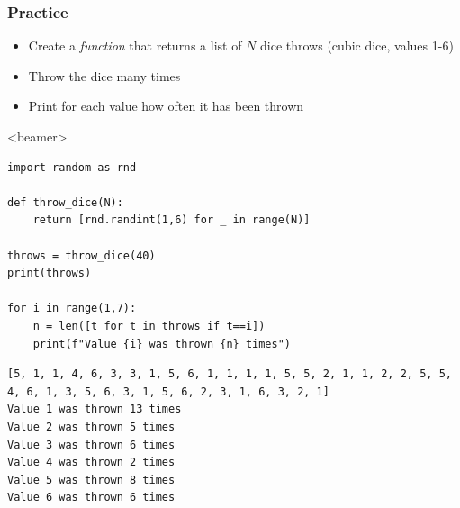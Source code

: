 \begin{frame}[fragile,label=practice_random]
  \frametitle{Practice}
  \begin{itemize}
    \item Create a \emph{function} that returns a list of $N$ dice throws (cubic dice, values 1-6)
    \item Throw the dice many times
    \item Print for each value how often it has been thrown
  \end{itemize} \pause
  \begin{onlyenv}<beamer>
    \begin{lstlisting}
import random as rnd

def throw_dice(N):
    return [rnd.randint(1,6) for _ in range(N)]

throws = throw_dice(40)
print(throws)

for i in range(1,7):
    n = len([t for t in throws if t==i])
    print(f"Value {i} was thrown {n} times")
        \end{lstlisting}\pause
  \end{onlyenv}
  \begin{lstlisting}[style=PyOutput,basicstyle=\tiny\ttfamily]
[5, 1, 1, 4, 6, 3, 3, 1, 5, 6, 1, 1, 1, 1, 5, 5, 2, 1, 1, 2, 2, 5, 5, 4, 6, 1, 3, 5, 6, 3, 1, 5, 6, 2, 3, 1, 6, 3, 2, 1]
Value 1 was thrown 13 times
Value 2 was thrown 5 times
Value 3 was thrown 6 times
Value 4 was thrown 2 times
Value 5 was thrown 8 times
Value 6 was thrown 6 times
  \end{lstlisting}
\end{frame}
